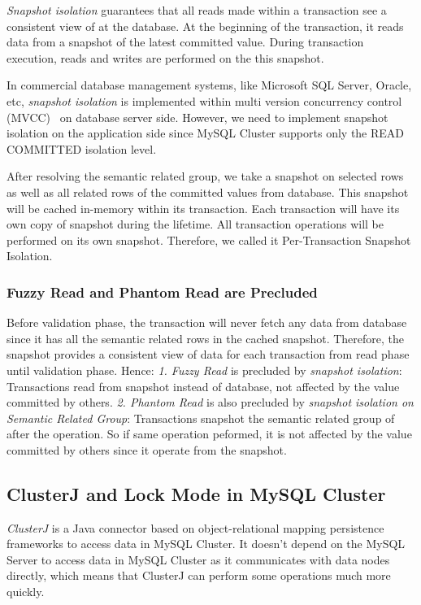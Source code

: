 \documentclass[runningheads,a4paper]{llncs}
\begin{document}
\textit{Snapshot isolation} guarantees that all reads made within a transaction see a consistent view of at the database. At the beginning of the transaction, it reads data from a snapshot of the latest committed value. During transaction execution, reads and writes are performed on the this snapshot.

In commercial database management systems, like Microsoft SQL Server, Oracle, etc, \textit{snapshot isolation} is implemented within multi version concurrency control (MVCC)~\cite{berenson1995critique} on database server side. However, we need to implement snapshot isolation on the application side since MySQL Cluster supports only the READ COMMITTED isolation level.

After resolving the semantic related group, we take a snapshot on selected rows as well as all related rows of the committed values from database. This snapshot will be cached in-memory within its transaction. Each transaction will have its own copy of snapshot during the lifetime. All transaction operations will be performed on its own snapshot. Therefore, we called it Per-Transaction Snapshot Isolation.

\subsubsection{Fuzzy Read and Phantom Read are Precluded}
Before validation phase, the transaction will never fetch any data from database since it has all the semantic related rows in the cached snapshot. Therefore, the snapshot provides a consistent view of data for each transaction from read phase until validation phase. Hence: \textit{1. Fuzzy Read} is precluded by \textit{snapshot isolation}: Transactions read from snapshot instead of database, not affected by the value committed by others. \textit{2. Phantom Read} is also precluded by \textit{snapshot isolation on Semantic Related Group}: Transactions snapshot the semantic related group of after the operation. So if same operation peformed, it is not affected by the value committed by others since it operate from the snapshot.

\subsection{ClusterJ and Lock Mode in MySQL Cluster}
\textit{ClusterJ} is a Java connector based on object-relational mapping persistence frameworks to access data in MySQL Cluster. It doesn't depend on the MySQL Server to access data in MySQL Cluster as it communicates with data nodes directly, which means that ClusterJ can perform some operations much more quickly.
\end{document}
